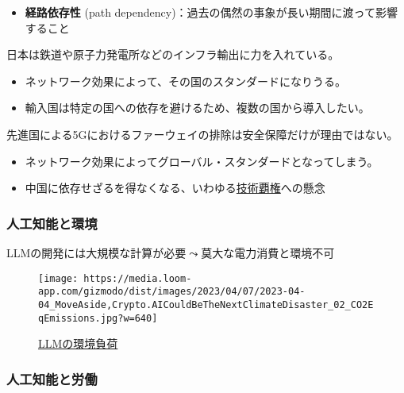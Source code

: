 \documentclass[
  xelatex,
  ja=standard]{bxjsarticle}
\providecommand{\tightlist}{%
  \setlength{\itemsep}{0pt}\setlength{\parskip}{0pt}}\usepackage{longtable,booktabs,array}
\begin{document}
\begin{itemize}
\tightlist
\item
  \textbf{経路依存性} (path
  dependency)：過去の偶然の事象が長い期間に渡って影響すること
\end{itemize}

日本は鉄道や原子力発電所などのインフラ輸出に力を入れている。

\begin{itemize}
\tightlist
\item
  ネットワーク効果によって、その国のスタンダードになりうる。
\item
  輸入国は特定の国への依存を避けるため、複数の国から導入したい。
\end{itemize}

先進国による5Gにおけるファーウェイの排除は安全保障だけが理由ではない。

\begin{itemize}
\tightlist
\item
  ネットワーク効果によってグローバル・スタンダードとなってしまう。
\item
  中国に依存せざるを得なくなる、いわゆる\href{https://www.jiia.or.jp/column/post-30.html}{技術覇権}への懸念
\end{itemize}

\hypertarget{ux4ebaux5de5ux77e5ux80fdux3068ux74b0ux5883}{%
\subsubsection{人工知能と環境}\label{ux4ebaux5de5ux77e5ux80fdux3068ux74b0ux5883}}

LLMの開発には大規模な計算が必要\(\leadsto\)莫大な電力消費と環境不可

\begin{figure}[htpb]

{\centering \texttt{[image: https://media.loom-app.com/gizmodo/dist/images/2023/04/07/2023-04-04\_MoveAside,Crypto.AICouldBeTheNextClimateDisaster\_02\_CO2EqEmissions.jpg?w=640]}

}

\caption{\href{https://www.gizmodo.jp/2023/04/chatgpt-ai-openai-carbon-emissions-stanford-report.html}{LLMの環境負荷}}

\end{figure}

\hypertarget{ux4ebaux5de5ux77e5ux80fdux3068ux52b4ux50cd}{%
\subsubsection{人工知能と労働}\label{ux4ebaux5de5ux77e5ux80fdux3068ux52b4ux50cd}}
\end{document}
